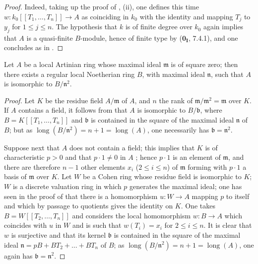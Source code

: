 \begin{proof}
Indeed, taking up the proof of , (ii), one defines this time $w:k_0[[T_1,\ldots,T_n]]\to A$ as coinciding in $k_0$ with the identity and mapping $T_j$ to $y_j$ for $1\leq j\leq n$.
The hypothesis that $k$ is of finite degree over $k_0$ again implies that $A$ is a quasi-finite $B$-module, hence of finite type by ($\mathbf{0_I}$, 7.4.1), and one concludes as in .
\end{proof}

\begin{corollary}[19.8.10]
\label{0.19.8.10}
Let $A$ be a local Artinian ring whose maximal ideal $\mathfrak{m}$ is of square zero; then there exists a regular local Noetherian ring $B$, with maximal ideal $\mathfrak{n}$, such that $A$ is isomorphic to $B/\mathfrak{n}^2$.
\end{corollary}

\begin{proof}
Let $K$ be the residue field $A/\mathfrak{m}$ of $A$, and $n$ the rank of $\mathfrak{m}/\mathfrak{m}^2=\mathfrak{m}$ over $K$.
If $A$ contains a field, it follows from  that $A$ is isomorphic to $B/\mathfrak{b}$, where $B=K[[T_1,\ldots,T_n]]$ and $\mathfrak{b}$ is contained in the square of the maximal ideal $\mathfrak{n}$ of $B$; but as $\operatorname{long}(B/\mathfrak{n}^2)=n+1=\operatorname{long}(A)$, one necessarily has $\mathfrak{b}=\mathfrak{n}^2$.

Suppose next that $A$ does not contain a field; this implies that $K$ is of characteristic $p>0$ and that $p\cdot 1\neq 0$ in $A$ ; hence $p\cdot 1$ is an element of $\mathfrak{m}$, and there are therefore $n-1$ other elements $x_i$ ($2\leq i\leq n$) of $\mathfrak{m}$ forming with $p\cdot 1$ a basis of $\mathfrak{m}$ over $K$.
Let $W$ be a Cohen ring whose residue field is isomorphic to $K$; $W$ is a discrete valuation ring in which $p$ generates the maximal ideal; one has seen in the proof of  that there is a homomorphism $u:W\to A$ mapping $p$ to itself and which by passage to quotients gives the identity on $K$.
One takes $B=W[[T_2,\ldots,T_n]]$ and considers the local homomorphism $w:B\to A$ which coincides with $u$ in $W$ and is such that $w(T_i)=x_i$ for $2\leq i\leq n$.
It is clear that $w$ is surjective and that its kernel $\mathfrak{b}$ is contained in the square of the maximal ideal $\mathfrak{n}=pB+BT_2+\ldots+BT_n$ of $B$; as $\operatorname{long}(B/\mathfrak{n}^2)=n+1=\operatorname{long}(A)$, one again has $\mathfrak{b}=\mathfrak{n}^2$.
\end{proof}

